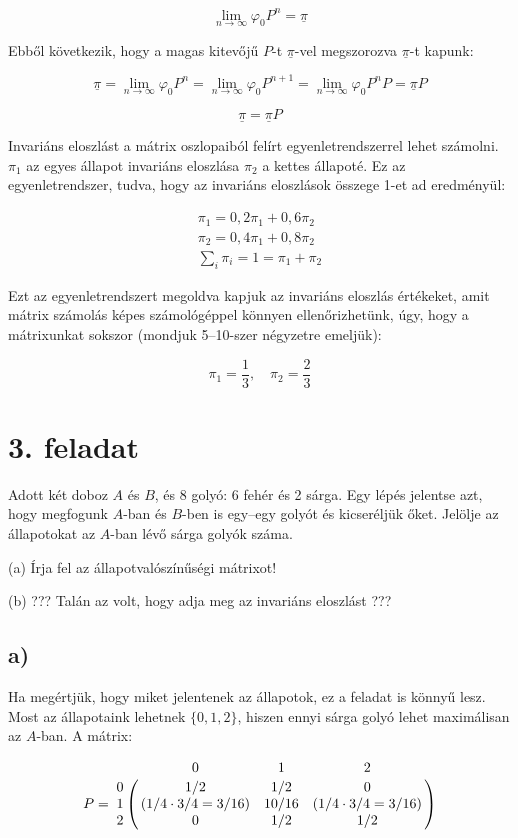 \documentclass[a4paper,12pt]{article}
\begin{document}
\[
\lim_{n\to \infty} \varphi_0 P^n = \underline{\pi}
\] 

Ebből következik, hogy a magas kitevőjű $P$-t $\underline{\pi}$-vel
megszorozva $\underline{\pi}$-t kapunk:

\[
\underline{\pi} = \lim_{n\to \infty} \varphi_0 P^n = 
\lim_{n\to \infty} \varphi_0 P^{n+1} = 
\lim_{n\to \infty} \varphi_0 P^n P = \underline{\pi} P
\]

\[
\underline{\pi} = \underline{\pi} P
\]

Invariáns eloszlást a mátrix oszlopaiból felírt
egyenletrendszerrel lehet számolni. $\pi_1$ az egyes állapot invariáns
eloszlása $\pi_2$ a kettes állapoté. Ez az egyenletrendszer, tudva, hogy 
az invariáns eloszlások összege 1-et ad eredményül:


\begin{eqnarray*}
\pi_1 = 0,2 \pi_1 + 0,6 \pi_2 \\
\pi_2 = 0,4 \pi_1 + 0,8 \pi_2 \\
\sum_i \pi_i = 1 = \pi_1 + \pi_2
\end{eqnarray*}

Ezt az egyenletrendszert megoldva kapjuk az invariáns eloszlás 
értékeket, amit mátrix számolás képes számológéppel könnyen
ellenőrizhetünk, úgy, hogy a mátrixunkat sokszor 
(mondjuk 5--10-szer négyzetre emeljük):

\[
\pi_1 = \frac{1}{3},\quad \pi_2 = \frac{2}{3}
\]

\section*{3. feladat}
Adott két doboz $A$ és $B$, és 8 golyó: 6 fehér és 2 sárga. Egy lépés
jelentse azt, hogy megfogunk $A$-ban és $B$-ben is egy--egy golyót és
kicseréljük őket. Jelölje az állapotokat az $A$-ban lévő sárga golyók
száma.

(a) Írja fel az állapotvalószínűségi mátrixot!

(b) ??? Talán az volt, hogy adja meg az invariáns eloszlást ???

\subsection*{a)}
Ha megértjük, hogy miket jelentenek az állapotok, ez a feladat is
könnyű lesz. Most az állapotaink lehetnek $\{0, 1, 2\}$, hiszen
ennyi sárga golyó lehet maximálisan az $A$-ban. A mátrix:

\[
P = 
\bordermatrix{
~	&	0    &    1      &	    2	\cr
0	&	1/2  &    1/2    &	    0	\cr
1	
&	(1/4 \cdot 3/4 = 3/16)
&	10/16
&   (1/4 \cdot 3/4 = 3/16)   \cr
2	&	0    &    1/2    &      1/2}
\]
\end{document}
